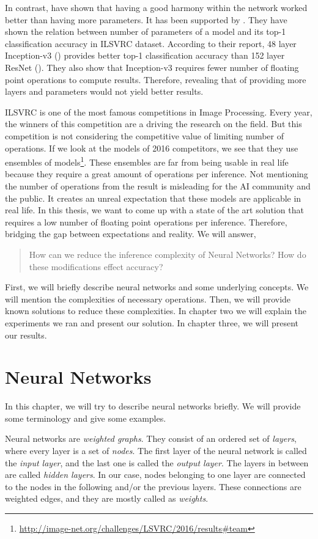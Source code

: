 In contrast, \cite{Szegedy:2014aa} have shown that having a good harmony within the network worked better than having more parameters. It has been supported by \cite{Canziani:2016aa}. They have shown the relation between number of parameters of a model and its top-1 classification accuracy in ILSVRC dataset. According to their report, 48 layer Inception-v3 (\cite{Szegedy_2016_CVPR}) provides better top-1 classification accuracy than 152 layer ResNet (\cite{He:2015aa}). They also show that Inception-v3 requires fewer number of floating point operations to compute results. Therefore, revealing that of providing more layers and parameters would not yield better results. 

ILSVRC is one of the most famous competitions in Image Processing. Every year, the winners of this competition are a driving the research on the field. But this competition is not considering the competitive value of limiting number of operations. If we look at the models of 2016 competitors, we see that they use ensembles of models\footnote{\url{http://image-net.org/challenges/LSVRC/2016/results\#team}}. These ensembles are far from being usable in real life because they require a great amount of operations per inference. Not mentioning the number of operations from the result is misleading for the AI community and the public. It creates an unreal expectation that these models are applicable in real life. In this thesis, we want to come up with a state of the art solution that requires a low number of floating point operations per inference. Therefore, bridging the gap between expectations and reality. We will answer,
\begin{quote}
How can we reduce the inference complexity of Neural Networks?
How do these modifications effect accuracy?
\end{quote}
First, we will briefly describe neural networks and some underlying concepts. We will mention the complexities of necessary operations. Then, we will provide known solutions to reduce these complexities. In chapter two we will explain the experiments we ran and present our solution. In chapter three, we will present our results. 

\section{Neural Networks}
In this chapter, we will try to describe neural networks briefly. We will provide some terminology and give some examples. 

Neural networks are \textit{weighted graphs}. They consist of an ordered set of \textit{layers}, where every layer is a set of \textit{nodes}. The first layer of the neural network is called the \textit{input layer}, and the last one is called the \textit{output layer}. The layers in between are called \textit{hidden layers}. In our case, nodes belonging to one layer are connected to the nodes in the following and/or the previous layers. These connections are weighted edges, and they are mostly called as \textit{weights}. 


